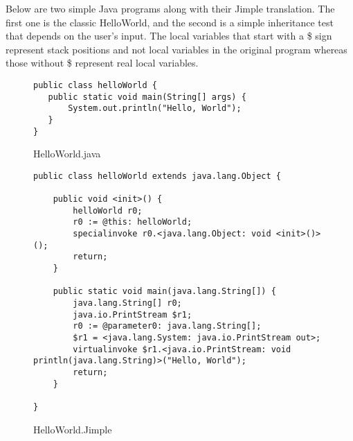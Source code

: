 \documentclass{dithesis}
\begin{document}
        Below are two simple Java programs along with their Jimple translation. The first one is the classic HelloWorld, and the second is a simple inheritance test that depends on the user's input.
       	The local variables that start with a \$ sign represent stack positions and not local variables in the original program whereas those without \$ represent real local variables.
            \begin{figure}[H]
\begin{lstlisting}
public class helloWorld {
   public static void main(String[] args) {
       System.out.println("Hello, World");
   }
}
\end{lstlisting}
            \caption{HelloWorld.java}
            \end{figure}
            \begin{figure}[H]
\begin{lstlisting}
public class helloWorld extends java.lang.Object {

    public void <init>() {
        helloWorld r0;
        r0 := @this: helloWorld;
        specialinvoke r0.<java.lang.Object: void <init>()>();
        return;
    }

    public static void main(java.lang.String[]) {
        java.lang.String[] r0;
        java.io.PrintStream $r1;
        r0 := @parameter0: java.lang.String[];
        $r1 = <java.lang.System: java.io.PrintStream out>;
        virtualinvoke $r1.<java.io.PrintStream: void println(java.lang.String)>("Hello, World");
        return;
    }

}
\end{lstlisting}
            \caption{HelloWorld.Jimple}
            \end{figure}
\end{document}
